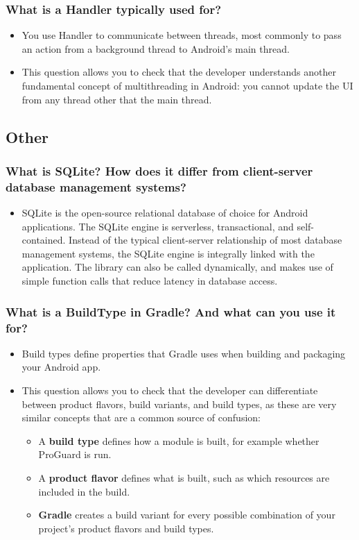 \documentclass[9pt, b5paper]{article}
\begin{document}
\subsubsection{What is a Handler typically used for?}
\label{sec-1-7-10}
\begin{itemize}
\item You use Handler to communicate between threads, most commonly to pass an action from a background thread to Android's main thread.
\item This question allows you to check that the developer understands another fundamental concept of multithreading in Android: you cannot update the UI from any thread other that the main thread.
\end{itemize}

\subsection{Other}
\label{sec-1-8}
\subsubsection{What is SQLite? How does it differ from client-server database management systems?}
\label{sec-1-8-1}
\begin{itemize}
\item SQLite is the open-source relational database of choice for Android applications. The SQLite engine is serverless, transactional, and self-contained. Instead of the typical client-server relationship of most database management systems, the SQLite engine is integrally linked with the application. The library can also be called dynamically, and makes use of simple function calls that reduce latency in database access.
\end{itemize}
\subsubsection{What is a BuildType in Gradle? And what can you use it for?}
\label{sec-1-8-2}
\begin{itemize}
\item Build types define properties that Gradle uses when building and packaging your Android app.
\item This question allows you to check that the developer can differentiate between product flavors, build variants, and build types, as these are very similar concepts that are a common source of confusion:
\begin{itemize}
\item A \textbf{build type} defines how a module is built, for example whether ProGuard is run.
\item A \textbf{product flavor} defines what is built, such as which resources are included in the build.
\item \textbf{Gradle} creates a build variant for every possible combination of your project's product flavors and build types.
\end{itemize}
\end{itemize}
\end{document}

